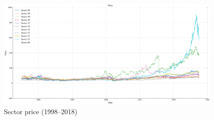 

\begin{figure}[H]
     \centering
     \includegraphics[width=\textwidth]{plots/data/sector_price.png}
     \caption{Sector price (1998--2018)}\label{fig:sector_price}
 \end{figure}


 





